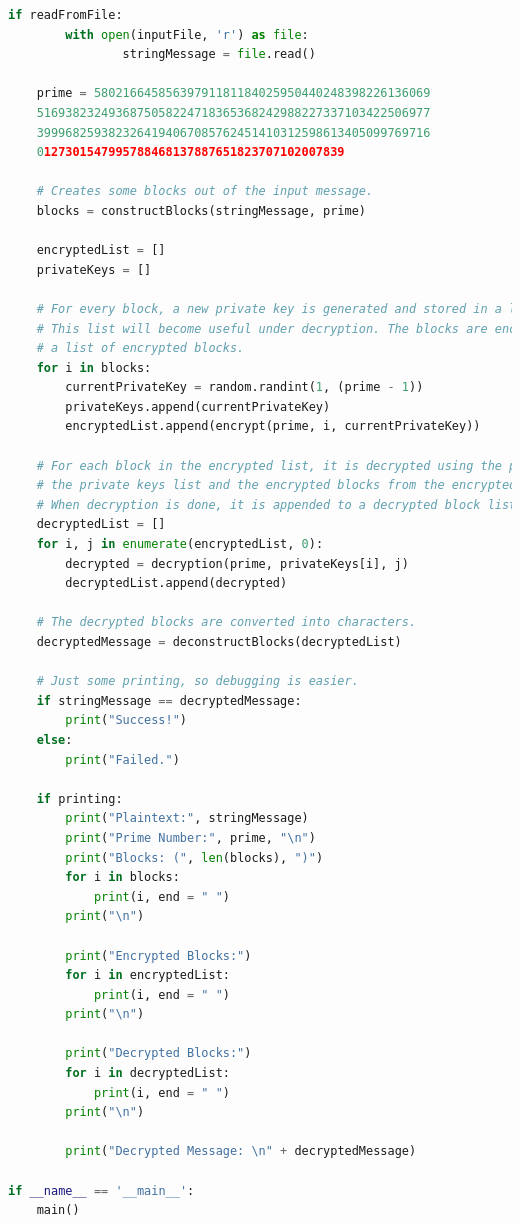 \documentclass{article}
\begin{document}
\begin{lstlisting}[language=Python,breaklines=true,showspaces=false]
    if readFromFile:
        with open(inputFile, 'r') as file:
                stringMessage = file.read()

    prime = 58021664585639791181184025950440248398226136069
	5169382324936875058224718365368242988227337103422506977
	3999682593823264194067085762451410312598613405099769716
	0127301547995788468137887651823707102007839

    # Creates some blocks out of the input message.
    blocks = constructBlocks(stringMessage, prime)

    encryptedList = []
    privateKeys = []

    # For every block, a new private key is generated and stored in a list of private keys.
    # This list will become useful under decryption. The blocks are encrypted and stored in
    # a list of encrypted blocks.
    for i in blocks:
        currentPrivateKey = random.randint(1, (prime - 1))
        privateKeys.append(currentPrivateKey)
        encryptedList.append(encrypt(prime, i, currentPrivateKey))

    # For each block in the encrypted list, it is decrypted using the private keys from
    # the private keys list and the encrypted blocks from the encrypted blocks list.
    # When decryption is done, it is appended to a decrypted block list.
    decryptedList = []
    for i, j in enumerate(encryptedList, 0):
        decrypted = decryption(prime, privateKeys[i], j)
        decryptedList.append(decrypted)

    # The decrypted blocks are converted into characters.
    decryptedMessage = deconstructBlocks(decryptedList)

    # Just some printing, so debugging is easier.
    if stringMessage == decryptedMessage:
        print("Success!")
    else:
        print("Failed.")

    if printing:
        print("Plaintext:", stringMessage)
        print("Prime Number:", prime, "\n")
        print("Blocks: (", len(blocks), ")")
        for i in blocks:
            print(i, end = " ")
        print("\n")

        print("Encrypted Blocks:")
        for i in encryptedList:
            print(i, end = " ")
        print("\n")

        print("Decrypted Blocks:")
        for i in decryptedList:
            print(i, end = " ")
        print("\n")

        print("Decrypted Message: \n" + decryptedMessage)

if __name__ == '__main__':
    main()
\end{lstlisting}

\newpage
\nocite{*}
{}

\end{document}
